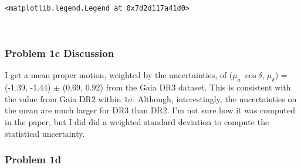 \documentclass[11pt]{article}
\makeatletter
\newcommand{\boxspacing}{\kern\kvtcb@left@rule\kern\kvtcb@boxsep}
\newcommand{\prompt}[4]{
        {\ttfamily\llap{{\color{#2}[#3]:\hspace{3pt}#4}}\vspace{-\baselineskip}}
    }
\makeatother
\begin{document}
            \begin{tcolorbox}[breakable, size=fbox, boxrule=.5pt, pad at break*=1mm, opacityfill=0]
\prompt{Out}{outcolor}{7}{\boxspacing}
\begin{Verbatim}[commandchars=\\\{\}]
<matplotlib.legend.Legend at 0x7d2d117a41d0>
\end{Verbatim}
\end{tcolorbox}
        
    \begin{center}
    \end{center}
    { \hspace*{\fill} \\}
    
    \subsubsection{Problem 1c Discussion}\label{problem-1c-discussion}

I get a mean proper motion, weighted by the uncertainties, of
(\(\mu_a~\cos\delta\), \(\mu_\delta\)) = (-1.39, -1.44) \(\pm\) (0.69,
0.92) from the Gaia DR3 dataset. This is consistent with the value from
Gaia DR2 within \(1\sigma\). Although, interestingly, the uncertainties
on the mean are much larger for DR3 than DR2. I'm not sure how it was
computed in the paper, but I did did a weighted standard deviation to
compute the statistical uncertainty.

\subsubsection{Problem 1d}\label{problem-1d}
\end{document}

